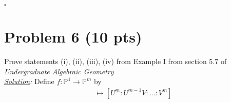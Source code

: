 \documentclass[12pt]{article}
\begin{document}
\hfill $\square$












\newpage


\section*{Problem 6 \small{(10 pts)}}
Prove statements (i), (ii), (iii), (iv) from Example I from section 5.7 of \textit{Undergraduate Algebraic Geometry}\\

\noindent \textit{\underline{Solution}:} Define $f : \mathbb{P}^1 \to \mathbb{P}^m$ by 
\begin{align*}
[U:V] \mapsto [U^m : U^{m-1}V : \dots : V^m]
\end{align*}
\end{document}

